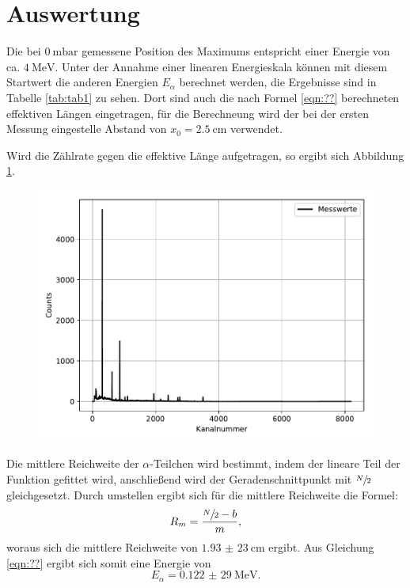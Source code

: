 \section{Auswertung}
\label{sec:Auswertung}

Die bei $\SI{0}{\milli\bar}$ gemessene Position des Maximums entspricht einer
Energie von ca. $\SI{4}{\MeV}$. Unter der Annahme einer linearen
Energieskala können mit diesem Startwert die anderen Energien $E_{\alpha}$
berechnet werden, die Ergebnisse sind in Tabelle \ref{tab:tab1} zu sehen.
Dort sind auch die nach Formel \ref{eqn:??} berechneten
effektiven Längen eingetragen, für die Berechneung wird der bei der
ersten Messung eingestelle Abstand von $x_0=\SI{2,5}{\cm}$ verwendet.



Wird die Zählrate gegen die effektive Länge aufgetragen, so ergibt sich
Abbildung \ref{fig:plot1}.

\begin{figure}[H]
  \centering
  \includegraphics{plot1.pdf}
  \caption{}
  \label{fig:plot1}
\end{figure}

Die mittlere Reichweite der $\alpha$-Teilchen wird bestimmt, indem
der lineare Teil der Funktion gefittet wird, anschließend wird der
Geradenschnittpunkt mit $\sfrac{N}{2}$ gleichgesetzt. Durch umstellen
ergibt sich für die mittlere Reichweite die Formel:
\begin{equation}
  R_m=\frac{\sfrac{N}{2}-b}{m},
  \label{eqn:mittel}
\end{equation}
woraus sich die mittlere Reichweite von $\SI{1,93(23)}{\cm}$ ergibt.
Aus Gleichung \ref{eqn:??} ergibt sich somit eine Energie von
\begin{equation*}
  E_{\alpha}=\SI{0,122(29)}{\MeV}.
\end{equation*}

